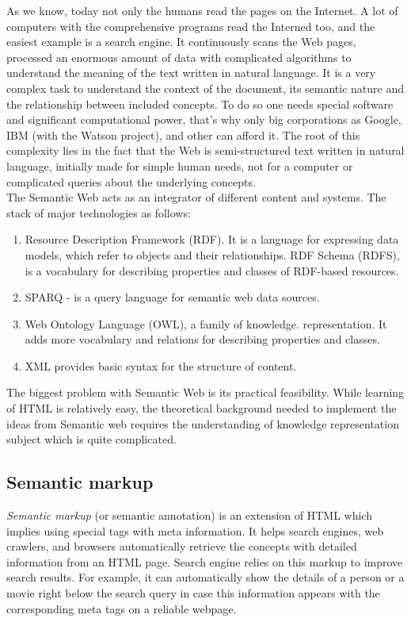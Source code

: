 As we know, today not only the humans read the pages on the Internet. A lot of computers with the comprehensive programs read the Interned too, and the easiest example is a search engine. It continuously scans the Web pages, processed an enormous amount of data with complicated algorithms to understand the meaning of the text written in natural language. It is a very complex task to understand the context of the document, its semantic nature and the relationship between included concepts. To do so one needs special software and significant computational power, that's why only big corporations as Google, IBM (with the Watson project), and other can afford it. The root of this complexity lies in the fact that the Web is semi-structured text written in natural language, initially made for simple human needs, not for a computer or complicated queries about the underlying concepts.\\ 

The Semantic Web acts as an integrator of different content and systems. The stack of major technologies as follows: 

\begin{enumerate}
    \item Resource Description Framework (RDF). It is a language for expressing data models, which refer to objects and their relationships. 
    \itme RDF Schema (RDFS), is a vocabulary for describing properties and classes of RDF-based resources.
    \item SPARQ - is a query language for semantic web data sources.
    \item Web Ontology Language (OWL), a family of knowledge. representation. It adds more vocabulary and relations for describing properties and classes.
    \item XML provides basic syntax for the structure of content.
\end{enumerate}

The biggest problem with Semantic Web is its practical feasibility. While learning of HTML is relatively easy, the theoretical background needed to implement the ideas from Semantic web requires the understanding of knowledge representation subject which is quite complicated. 

\subsection{Semantic markup}
\textit{Semantic markup} (or semantic annotation) is an extension of HTML which implies using special tags with meta information. It helps search engines, web crawlers, and browsers automatically retrieve the concepts with detailed information from an HTML page. Search engine relies on this markup to improve search results. For example, it can automatically show the details of a person or a movie right below the search query in case this information appears with the corresponding meta tags on a reliable webpage.\\ 

